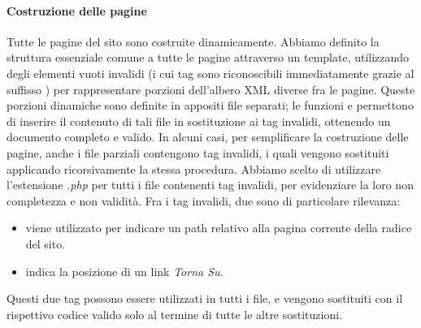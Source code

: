 \paragraph{Costruzione delle pagine}
Tutte le pagine del sito sono costruite dinamicamente.
Abbiamo definito la struttura essenziale comune a tutte le pagine attraverso un template, utilizzando degli elementi vuoti invalidi (i cui tag sono riconoscibili immediatamente grazie al suffisso ) per rappresentare porzioni dell'albero XML diverse fra le pagine.
Queste porzioni dinamiche sono definite in appositi file separati; le funzioni  e  permettono di inserire il contenuto di tali file in sostituzione ai tag invalidi, ottenendo un documento completo e valido.
In alcuni casi, per semplificare la costruzione delle pagine, anche i file parziali contengono tag invalidi, i quali vengono sostituiti applicando ricorsivamente la stessa procedura.
Abbiamo scelto di utilizzare l'estensione \textit{.php} per tutti i file contenenti tag invalidi, per evidenziare la loro non completezza e non validità.
Fra i tag invalidi, due sono di particolare rilevanza:
\begin{itemize}
	\item {} viene utilizzato per indicare un path relativo alla pagina corrente della radice del sito.
	\item {} indica la posizione di un link \textit{Torna Su}.
\end{itemize}
Questi due tag possono essere utilizzati in tutti i file, e vengono sostituiti con il rispettivo codice valido solo al termine di tutte le altre sostituzioni.

